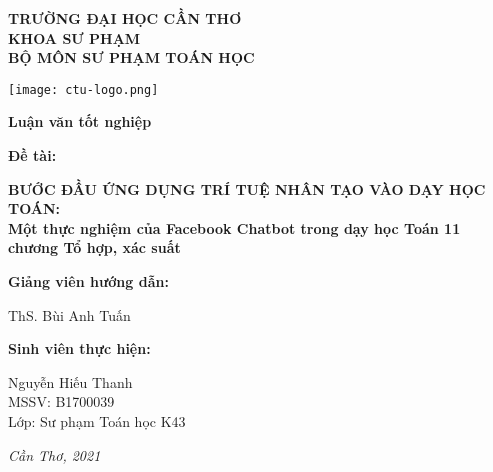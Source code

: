 \thispagestyle{empty}
\begin{center}\large
	\textbf{TRƯỜNG ĐẠI HỌC CẦN THƠ}\\
	\textbf{KHOA SƯ PHẠM}\\
	\textbf{BỘ MÔN SƯ PHẠM TOÁN HỌC}
\end{center}
\vfill
{\centering\texttt{[image: ctu-logo.png]}\par}
\vfill
{\centering\LARGE\textbf{Luận văn tốt nghiệp}\par}
\vfill
\begin{adjustwidth}{-1cm}{-1cm}
\begin{center}\huge
	\textbf{Đề tài:}\par
	\textbf{
		BƯỚC ĐẦU ỨNG DỤNG TRÍ TUỆ NHÂN TẠO VÀO DẠY HỌC TOÁN:\\
		Một thực nghiệm của Facebook Chatbot trong dạy học Toán 11\\ chương Tổ hợp, xác suất
	}
\end{center}
\end{adjustwidth}
\vfill
\begin{adjustwidth}{1cm}{-1cm}
\begin{multicols}{2}\large
	\textbf{Giảng viên hướng dẫn:}\par
	ThS. Bùi Anh Tuấn\par
	\columnbreak
	\textbf{Sinh viên thực hiện:}\par
	Nguyễn Hiếu Thanh\\
	MSSV: B1700039\\
	Lớp: Sư phạm Toán học K43
\end{multicols}
\end{adjustwidth}
\vfill
{\centering\large\textit{Cần Thơ, 2021}\par}
\newpage